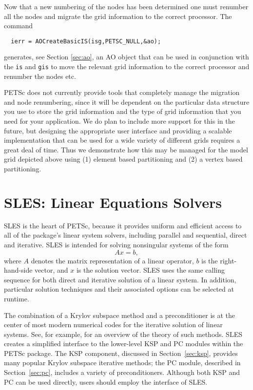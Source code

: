 Now that a new numbering of the nodes has been determined one must 
renumber all the nodes and migrate the grid information to the correct processor.
The command
\begin{verbatim}
  ierr = AOCreateBasicIS(isg,PETSC_NULL,&ao);
\end{verbatim}
generates, see Section \ref{sec:ao}, an AO object that can be used in conjunction with the
{\tt is} and {\tt gis} to move the relevant grid information to the correct processor
and renumber the nodes etc. 

PETSc does not currently provide tools that completely manage the migration and 
node renumbering, since it will be dependent on the particular data structure you 
use to store the grid information and the type of grid information that you need
for your application. We do plan to include more support for this in the future,
but designing the appropriate user interface and providing a scalable implementation
that can be used for a wide variety of different grids requires a great deal of time.
Thus we demonstrate how this may be managed for the model
grid depicted above using (1) element based partitioning and (2) a vertex based 
partitioning. 



 


\chapter{SLES: Linear Equations Solvers} 
\label{ch:sles}

SLES is the heart of PETSc, because it provides uniform and efficient access 
to all of the package's linear system solvers, including parallel and sequential,
direct and iterative.
SLES is intended for solving nonsingular systems of the form
\begin{equation}
   A x = b,
\label{eq:Ax=b}
\end{equation}
where $ A$ denotes the matrix representation of a linear operator, $b$
is the right-hand-side vector, and $ x $ is the solution vector.  SLES
uses the same calling sequence for both direct and iterative solution
of a linear system.  In addition, particular solution techniques and
their associated options can be selected at runtime.

The combination of a Krylov subspace method and a preconditioner is at
the center of most modern numerical codes for the iterative solution of
linear systems.  See, for example, \cite{fgn} for an overview of the theory
of such methods.  SLES creates a simplified interface to the
lower-level KSP and PC modules within the PETSc package.  The KSP component, 
discussed in
Section~\ref{sec:ksp}, provides many popular Krylov
 subspace iterative methods;
the PC module, described in Section~\ref{sec:pc}, includes a
variety of preconditioners.  Although both  KSP and PC can be used
directly, users should employ the interface of SLES.

